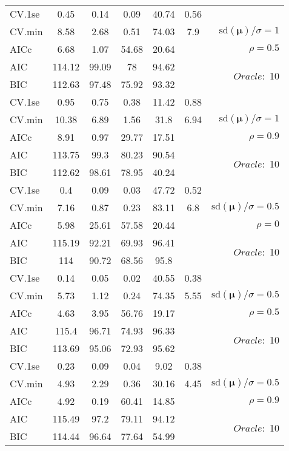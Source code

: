 \begin{table}
\begin{center}
\begin{tabular}{l*{5}{c}|r}
 \hline 
CV.1se & 0.45 & 0.14 & 0.09 & 40.74 & 0.56 & \\
CV.min & 8.58 & 2.68 & 0.51 & 74.03 & 7.9 &  $\mathrm{sd}(\mathbf{\mu})/\sigma=1$ \\
AICc & 6.68 & 1.07 & 54.68 & 20.64 & & $\rho=0.5$ \\
AIC & 114.12 & 99.09 & 78 & 94.62 & &  \multirow{2}{*}{$Oracle: $ 10} \\
BIC & 112.63 & 97.48 & 75.92 & 93.32 & &  \\
 \hline 
CV.1se & 0.95 & 0.75 & 0.38 & 11.42 & 0.88 & \\
CV.min & 10.38 & 6.89 & 1.56 & 31.8 & 6.94 &  $\mathrm{sd}(\mathbf{\mu})/\sigma=1$ \\
AICc & 8.91 & 0.97 & 29.77 & 17.51 & & $\rho=0.9$ \\
AIC & 113.75 & 99.3 & 80.23 & 90.54 & &  \multirow{2}{*}{$Oracle: $ 10} \\
BIC & 112.62 & 98.61 & 78.95 & 40.24 & &  \\
 \hline 
CV.1se & 0.4 & 0.09 & 0.03 & 47.72 & 0.52 & \\
CV.min & 7.16 & 0.87 & 0.23 & 83.11 & 6.8 &  $\mathrm{sd}(\mathbf{\mu})/\sigma=0.5$ \\
AICc & 5.98 & 25.61 & 57.58 & 20.44 & & $\rho=0$ \\
AIC & 115.19 & 92.21 & 69.93 & 96.41 & &  \multirow{2}{*}{$Oracle: $ 10} \\
BIC & 114 & 90.72 & 68.56 & 95.8 & &  \\
 \hline 
CV.1se & 0.14 & 0.05 & 0.02 & 40.55 & 0.38 & \\
CV.min & 5.73 & 1.12 & 0.24 & 74.35 & 5.55 &  $\mathrm{sd}(\mathbf{\mu})/\sigma=0.5$ \\
AICc & 4.63 & 3.95 & 56.76 & 19.17 & & $\rho=0.5$ \\
AIC & 115.4 & 96.71 & 74.93 & 96.33 & &  \multirow{2}{*}{$Oracle: $ 10} \\
BIC & 113.69 & 95.06 & 72.93 & 95.62 & &  \\
 \hline 
CV.1se & 0.23 & 0.09 & 0.04 & 9.02 & 0.38 & \\
CV.min & 4.93 & 2.29 & 0.36 & 30.16 & 4.45 &  $\mathrm{sd}(\mathbf{\mu})/\sigma=0.5$ \\
AICc & 4.92 & 0.19 & 60.41 & 14.85 & & $\rho=0.9$ \\
AIC & 115.49 & 97.2 & 79.11 & 94.12 & &  \multirow{2}{*}{$Oracle: $ 10} \\
BIC & 114.44 & 96.64 & 77.64 & 54.99 & &  \\
 \hline 
\end{tabular}
\end{center}
\vspace{-1cm}
\end{table}





